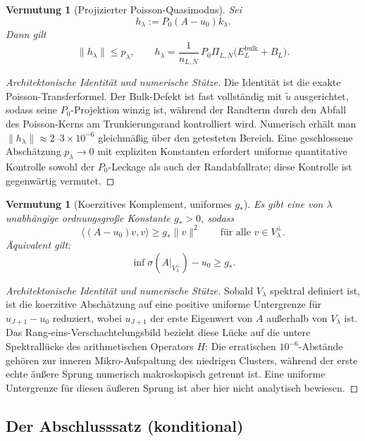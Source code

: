 \documentclass[12pt,a4paper]{article}
\newtheorem{conjecture}[theorem]{Vermutung}
\theoremstyle{definition}
\theoremstyle{remark}
\newcommand{\ip}[2]{\langle #1, #2 \rangle}
\newcommand{\norm}[1]{\| #1 \|}
\newcommand{\utilde}{\tilde{u}}
\begin{document}
\begin{conjecture}[Projizierter Poisson-Quasimodus]
\label{lem:projected-poisson}
Sei
\[
  h_\lambda := P_0(A-u_0)k_\lambda.
\]
Dann gilt
\[
  \norm{h_\lambda} \le p_\lambda,
  \qquad
  h_\lambda
  =
  \frac{1}{n_{L,N}}\,P_0\Pi_{L,N}\!\bigl(E_L^{\mathrm{bulk}} + B_L\bigr).
\]
\end{conjecture}

\begin{proof}[Architektonische Identität und numerische Stütze]
Die Identität ist die exakte Poisson-Transferformel. Der Bulk-Defekt ist
fast vollständig mit $\utilde$ ausgerichtet, sodass seine $P_0$-Projektion
winzig ist, während der Randterm durch den Abfall des Poisson-Kerns am
Trunkierungsrand kontrolliert wird. Numerisch erhält man
$\norm{h_\lambda} \approx 2$--$3\times 10^{-6}$ gleichmäßig über den
getesteten Bereich. Eine geschlossene Abschätzung $p_\lambda\to 0$ mit
expliziten Konstanten erfordert uniforme quantitative Kontrolle sowohl der
$P_0$-Leckage als auch der Randabfallrate; diese Kontrolle ist gegenwärtig
vermutet.
\end{proof}

\begin{conjecture}[Koerzitives Komplement, uniformes $g_*$]
\label{lem:coercive-complement}
Es gibt eine von $\lambda$ unabhängige ordnungsgroße Konstante $g_* > 0$,
sodass
\[
  \ip{(A-u_0)v}{v} \ge g_* \norm{v}^2
  \qquad\text{für alle } v \in V_\lambda^\perp.
\]
Äquivalent gilt:
\[
  \inf \sigma(A|_{V_\lambda^\perp}) - u_0 \ge g_*.
\]
\end{conjecture}

\begin{proof}[Architektonische Identität und numerische Stütze]
Sobald $V_\lambda$ spektral definiert ist, ist die koerzitive Abschätzung
auf eine positive uniforme Untergrenze für $u_{J+1}-u_0$ reduziert, wobei
$u_{J+1}$ der erste Eigenwert von $A$ außerhalb von $V_\lambda$ ist. Das
Rang-eins-Verschachtelungsbild bezieht diese Lücke auf die untere
Spektrallücke des arithmetischen Operators $H$: Die erratischen
$10^{-6}$-Abstände gehören zur inneren Mikro-Aufspaltung des niedrigen
Clusters, während der erste echte äußere Sprung numerisch makroskopisch
getrennt ist. Eine uniforme Untergrenze für diesen äußeren Sprung ist aber
hier nicht analytisch bewiesen.
\end{proof}

\subsection{Der Abschlusssatz (konditional)}
\end{document}
